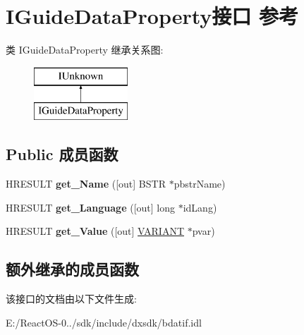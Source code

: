 \hypertarget{interface_i_guide_data_property}{}\section{I\+Guide\+Data\+Property接口 参考}
\label{interface_i_guide_data_property}
类 I\+Guide\+Data\+Property 继承关系图\+:\begin{figure}[H]
\begin{center}
\leavevmode
\includegraphics[height=2.000000cm]{interface_i_guide_data_property}
\end{center}
\end{figure}
\subsection*{Public 成员函数}
\begin{DoxyCompactItemize}
\item 
\mbox{\label{interface_i_guide_data_property_a26b625157759fdb8eaaed98a33388cf8}} 
H\+R\+E\+S\+U\+LT {\bfseries get\+\_\+\+Name} (\mbox{[}out\mbox{]} B\+S\+TR $\ast$pbstr\+Name)
\item 
\mbox{\label{interface_i_guide_data_property_ad19ea7d38a9d1c94b615a66ac30cc690}} 
H\+R\+E\+S\+U\+LT {\bfseries get\+\_\+\+Language} (\mbox{[}out\mbox{]} long $\ast$id\+Lang)
\item 
\mbox{\label{interface_i_guide_data_property_abfe83bc868bf70111ee5e8f570c4755b}} 
H\+R\+E\+S\+U\+LT {\bfseries get\+\_\+\+Value} (\mbox{[}out\mbox{]} \hyperlink{structtag_v_a_r_i_a_n_t}{V\+A\+R\+I\+A\+NT} $\ast$pvar)
\end{DoxyCompactItemize}
\subsection*{额外继承的成员函数}


该接口的文档由以下文件生成\+:\begin{DoxyCompactItemize}
\item 
E\+:/\+React\+O\+S-\/0../sdk/include/dxsdk/bdatif.\+idl\end{DoxyCompactItemize}
